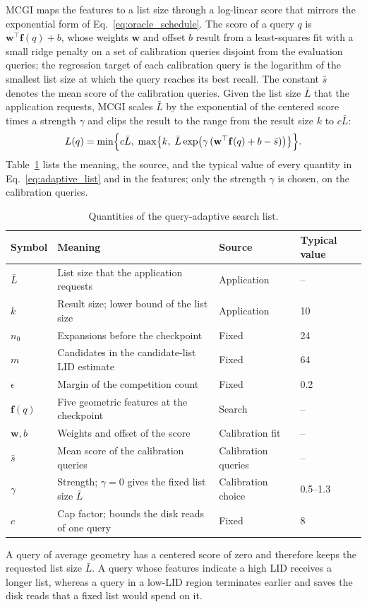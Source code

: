 \documentclass{article}
\theoremstyle{plain}
\theoremstyle{definition}
\theoremstyle{remark}
\newcommand{\ours}{MCGI\xspace}
\begin{document}
\ours{} maps the features to a list size through a log-linear score that mirrors the exponential form of Eq.~\eqref{eq:oracle_schedule}. The score of a query $q$ is $\mathbf{w}^{\top}\mathbf{f}(q) + b$, whose weights $\mathbf{w}$ and offset $b$ result from a least-squares fit with a small ridge penalty on a set of calibration queries disjoint from the evaluation queries; the regression target of each calibration query is the logarithm of the smallest list size at which the query reaches its best recall. The constant $\bar{s}$ denotes the mean score of the calibration queries. Given the list size $\bar{L}$ that the application requests, \ours{} scales $\bar{L}$ by the exponential of the centered score times a strength $\gamma$ and clips the result to the range from the result size $k$ to $c\bar{L}$:
\begin{equation}
    L(q) = \min\Bigl\{ c\bar{L},\; \max\bigl\{ k,\; \bar{L} \exp\bigl(\gamma\,(\mathbf{w}^{\top}\mathbf{f}(q) + b - \bar{s})\bigr) \bigr\} \Bigr\}.
    \label{eq:adaptive_list}
\end{equation}
Table~\ref{tab:adaptive_params} lists the meaning, the source, and the typical value of every quantity in Eq.~\eqref{eq:adaptive_list} and in the features; only the strength $\gamma$ is chosen, on the calibration queries.

\begin{table}[t]
\centering
\small
\caption{Quantities of the query-adaptive search list.}
\label{tab:adaptive_params}
\begin{tabular}{llll}
\toprule
Symbol & Meaning & Source & Typical value \\
\midrule
$\bar{L}$ & List size that the application requests & Application & -- \\
$k$ & Result size; lower bound of the list size & Application & 10 \\
$n_0$ & Expansions before the checkpoint & Fixed & 24 \\
$m$ & Candidates in the candidate-list LID estimate & Fixed & 64 \\
$\epsilon$ & Margin of the competition count & Fixed & 0.2 \\
$\mathbf{f}(q)$ & Five geometric features at the checkpoint & Search & -- \\
$\mathbf{w}, b$ & Weights and offset of the score & Calibration fit & -- \\
$\bar{s}$ & Mean score of the calibration queries & Calibration queries & -- \\
$\gamma$ & Strength; $\gamma = 0$ gives the fixed list size $\bar{L}$ & Calibration choice & 0.5--1.3 \\
$c$ & Cap factor; bounds the disk reads of one query & Fixed & 8 \\
\bottomrule
\end{tabular}
\end{table}
A query of average geometry has a centered score of zero and therefore keeps the requested list size $\bar{L}$. A query whose features indicate a high LID receives a longer list, whereas a query in a low-LID region terminates earlier and saves the disk reads that a fixed list would spend on it.
\end{document}
